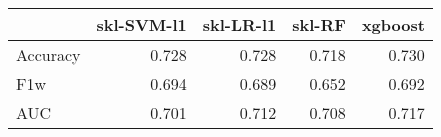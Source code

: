 \begin{tabular}{lrrrr}
\toprule
{} &  skl-SVM-l1 &  skl-LR-l1 &  skl-RF &  xgboost \\
\midrule
Accuracy &       0.728 &      0.728 &   0.718 &    0.730 \\
F1w      &       0.694 &      0.689 &   0.652 &    0.692 \\
AUC      &       0.701 &      0.712 &   0.708 &    0.717 \\
\bottomrule
\end{tabular}
